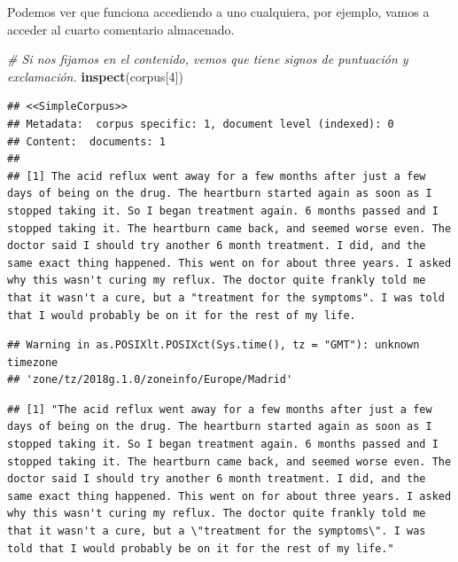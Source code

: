 \documentclass[spanish,]{article}
\newenvironment{Shaded}{\begin{snugshade}}{\end{snugshade}}
\newcommand{\KeywordTok}[1]{\textcolor[rgb]{0.13,0.29,0.53}{\textbf{#1}}}
\newcommand{\DecValTok}[1]{\textcolor[rgb]{0.00,0.00,0.81}{#1}}
\newcommand{\CommentTok}[1]{\textcolor[rgb]{0.56,0.35,0.01}{\textit{#1}}}
\newcommand{\OperatorTok}[1]{\textcolor[rgb]{0.81,0.36,0.00}{\textbf{#1}}}
\newcommand{\NormalTok}[1]{#1}
\begin{document}
Podemos ver que funciona accediendo a uno cualquiera, por ejemplo, vamos
a acceder al cuarto comentario almacenado.

\begin{Shaded}
\begin{Highlighting}[]
\CommentTok{# Si nos fijamos en el contenido, vemos que tiene signos de puntuación y exclamación.}
\KeywordTok{inspect}\NormalTok{(corpus[}\DecValTok{4}\NormalTok{])}
\end{Highlighting}
\end{Shaded}

\begin{verbatim}
## <<SimpleCorpus>>
## Metadata:  corpus specific: 1, document level (indexed): 0
## Content:  documents: 1
## 
## [1] The acid reflux went away for a few months after just a few days of being on the drug. The heartburn started again as soon as I stopped taking it. So I began treatment again. 6 months passed and I stopped taking it. The heartburn came back, and seemed worse even. The doctor said I should try another 6 month treatment. I did, and the same exact thing happened. This went on for about three years. I asked why this wasn't curing my reflux. The doctor quite frankly told me that it wasn't a cure, but a "treatment for the symptoms". I was told that I would probably be on it for the rest of my life.
\end{verbatim}

\begin{Shaded}
\end{Shaded}

\begin{verbatim}
## Warning in as.POSIXlt.POSIXct(Sys.time(), tz = "GMT"): unknown timezone
## 'zone/tz/2018g.1.0/zoneinfo/Europe/Madrid'
\end{verbatim}

\begin{verbatim}
## [1] "The acid reflux went away for a few months after just a few days of being on the drug. The heartburn started again as soon as I stopped taking it. So I began treatment again. 6 months passed and I stopped taking it. The heartburn came back, and seemed worse even. The doctor said I should try another 6 month treatment. I did, and the same exact thing happened. This went on for about three years. I asked why this wasn't curing my reflux. The doctor quite frankly told me that it wasn't a cure, but a \"treatment for the symptoms\". I was told that I would probably be on it for the rest of my life."
\end{verbatim}
\end{document}
